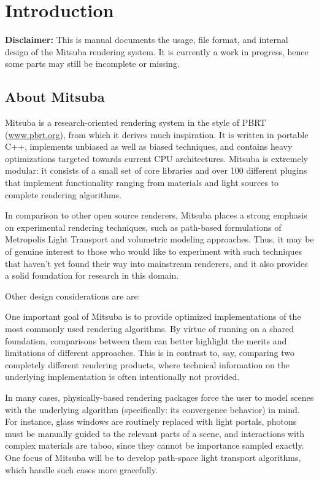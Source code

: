 \section{Introduction}
\textbf{Disclaimer:} This is manual documents the usage, file format, and
internal design of the Mitsuba rendering system. It is currently a work 
in progress, hence some parts may still be incomplete or missing.

\subsection{About Mitsuba}
Mitsuba is a research-oriented rendering system in the style of PBRT 
(\url{www.pbrt.org}), from which it derives much inspiration.
It is written in portable C++, implements unbiased as well 
as biased techniques, and contains heavy optimizations targeted 
towards current CPU architectures. 
Mitsuba is extremely modular: it consists of a small set of core libraries 
and over 100 different plugins that implement functionality ranging 
from materials and light sources to complete rendering algorithms.

In comparison to other open source renderers, Mitsuba places a strong 
emphasis on experimental rendering techniques, such as path-based 
formulations of Metropolis Light Transport and volumetric
modeling approaches. Thus, it may be of genuine interest to those who
would like to experiment with such techniques that haven't yet found 
their way into mainstream renderers, and it also provides a solid 
foundation for research in this domain.

Other design considerations are are:

One important goal of Mitsuba is to provide optimized implementations of the most commonly 
used rendering algorithms. By virtue of running on a shared foundation, comparisons between them can
better highlight the merits and limitations of different approaches. This is in contrast to, say, 
comparing two completely different rendering products, where technical information on the underlying 
implementation is often intentionally not provided.

In many cases, physically-based rendering packages force the user to model scenes with the underlying 
algorithm (specifically: its convergence behavior) in mind. For instance, glass windows are routinely 
replaced with light portals, photons must be manually guided to the relevant parts of a scene, and 
interactions with complex materials are taboo, since they cannot be importance sampled exactly. 
One focus of Mitsuba will be to develop path-space light transport algorithms, which handle such 
cases more gracefully.

